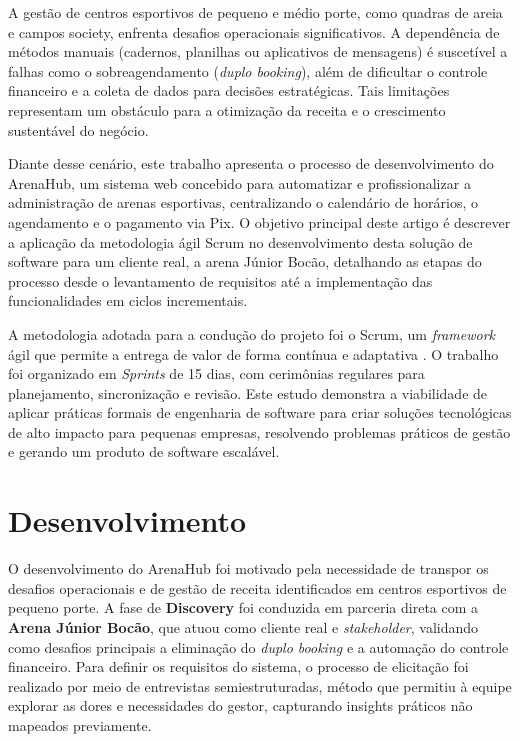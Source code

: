 \documentclass[a4paper, 12pt, twoside]{article}
\begin{document}
A gestão de centros esportivos de pequeno e médio porte, como quadras de areia e campos society, enfrenta desafios operacionais significativos. A dependência de métodos manuais (cadernos, planilhas ou aplicativos de mensagens) é suscetível a falhas como o sobreagendamento (\textit{duplo booking}), além de dificultar o controle financeiro e a coleta de dados para decisões estratégicas. Tais limitações representam um obstáculo para a otimização da receita e o crescimento sustentável do negócio.

Diante desse cenário, este trabalho apresenta o processo de desenvolvimento do ArenaHub, um sistema web concebido para automatizar e profissionalizar a administração de arenas esportivas, centralizando o calendário de horários, o agendamento e o pagamento via Pix. O objetivo principal deste artigo é descrever a aplicação da metodologia ágil Scrum no desenvolvimento desta solução de software para um cliente real, a arena Júnior Bocão, detalhando as etapas do processo desde o levantamento de requisitos até a implementação das funcionalidades em ciclos incrementais.

A metodologia adotada para a condução do projeto foi o Scrum, um \textit{framework} ágil que permite a entrega de valor de forma contínua e adaptativa \cite{SchwaberSutherland2020}. O trabalho foi organizado em \textit{Sprints} de 15 dias, com cerimônias regulares para planejamento, sincronização e revisão. Este estudo demonstra a viabilidade de aplicar práticas formais de engenharia de software para criar soluções tecnológicas de alto impacto para pequenas empresas, resolvendo problemas práticos de gestão e gerando um produto de software escalável.

\section{Desenvolvimento}

O desenvolvimento do ArenaHub foi motivado pela necessidade de transpor os desafios operacionais e de gestão de receita identificados em centros esportivos de pequeno porte. A fase de \textbf{Discovery} foi conduzida em parceria direta com a \textbf{Arena Júnior Bocão}, que atuou como cliente real e \textit{stakeholder}, validando como desafios principais a eliminação do \textit{duplo booking} e a automação do controle financeiro. Para definir os requisitos do sistema, o processo de elicitação foi realizado por meio de entrevistas semiestruturadas, método que permitiu à equipe explorar as dores e necessidades do gestor, capturando insights práticos não mapeados previamente.
\end{document}
